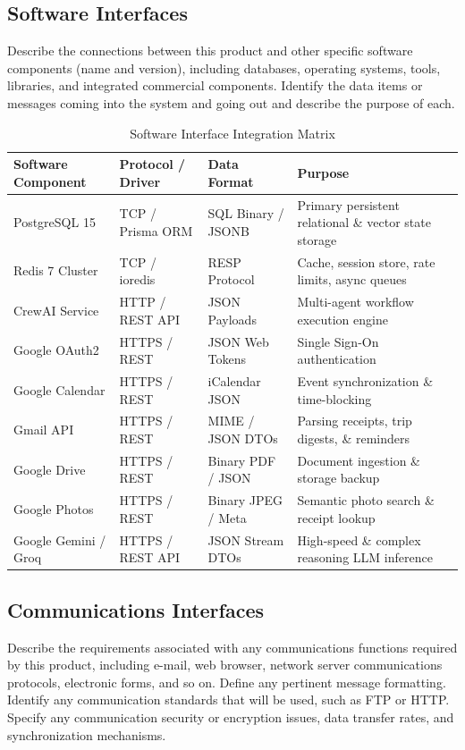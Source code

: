 \documentclass[11pt,a4paper]{article}
\begin{document}
\subsection{Software Interfaces}
Describe the connections between this product and other specific software components (name and version), including databases, operating systems, tools, libraries, and integrated commercial components. Identify the data items or messages coming into the system and going out and describe the purpose of each.

\begin{table}[h!]
\centering
\small
\begin{tabularx}{\textwidth}{|>{\raggedright\arraybackslash}p{3.0cm}|>{\raggedright\arraybackslash}p{2.5cm}|>{\raggedright\arraybackslash}p{2.5cm}|>{\raggedright\arraybackslash}X|}
\hline
\textbf{Software Component} & \textbf{Protocol / Driver} & \textbf{Data Format} & \textbf{Purpose} \\ \hline
PostgreSQL 15 & TCP / Prisma ORM & SQL Binary / JSONB & Primary persistent relational \& vector state storage \\ \hline
Redis 7 Cluster & TCP / ioredis & RESP Protocol & Cache, session store, rate limits, async queues \\ \hline
CrewAI Service & HTTP / REST API & JSON Payloads & Multi-agent workflow execution engine \\ \hline
Google OAuth2 & HTTPS / REST & JSON Web Tokens & Single Sign-On authentication \\ \hline
Google Calendar & HTTPS / REST & iCalendar JSON & Event synchronization \& time-blocking \\ \hline
Gmail API & HTTPS / REST & MIME / JSON DTOs & Parsing receipts, trip digests, \& reminders \\ \hline
Google Drive & HTTPS / REST & Binary PDF / JSON & Document ingestion \& storage backup \\ \hline
Google Photos & HTTPS / REST & Binary JPEG / Meta & Semantic photo search \& receipt lookup \\ \hline
Google Gemini / Groq & HTTPS / REST API & JSON Stream DTOs & High-speed \& complex reasoning LLM inference \\ \hline
\end{tabularx}
\caption{Software Interface Integration Matrix}
\end{table}

\subsection{Communications Interfaces}
Describe the requirements associated with any communications functions required by this product, including e-mail, web browser, network server communications protocols, electronic forms, and so on. Define any pertinent message formatting. Identify any communication standards that will be used, such as FTP or HTTP. Specify any communication security or encryption issues, data transfer rates, and synchronization mechanisms.
\end{document}
